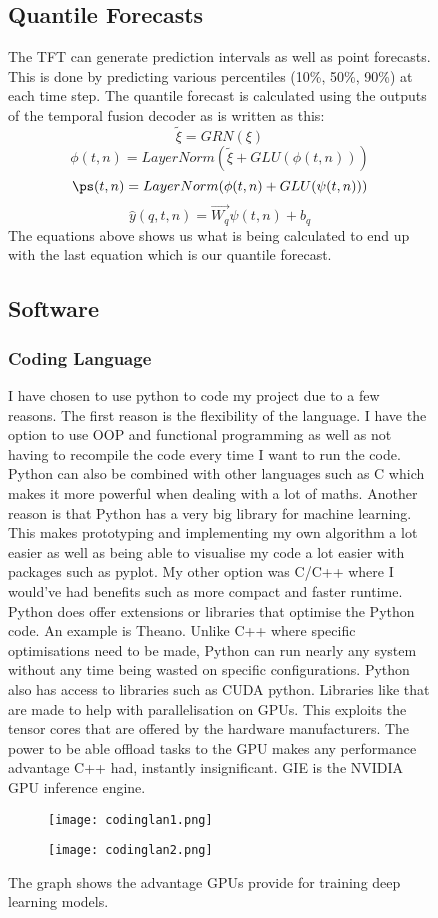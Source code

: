 \documentclass{article}
\begin{document}
\begin{figure}[h!]
\subsection{Quantile Forecasts}
The TFT can generate prediction intervals as well as point forecasts. This is done by predicting various percentiles (10\%, 50\%, 90\%) at each time step. The quantile forecast is calculated using the outputs of the temporal fusion decoder as is written as this:
$$\tilde{\xi} = GRN(\xi)$$
$$\phi(t,n)=LayerNorm(\tilde{\xi}+ GLU(\phi(t,n)))$$
$$\ps(t,n)= LayerNorm(\phi(t,n)+GLU(\psi(t,n)))$$
$$\hat{y}(q,t,n)=\vec{W_q}\psi(t,n)+b_q$$
The equations above shows us what is being calculated to end up with the last equation which is our quantile forecast.


\subsection{Software}

\subsubsection{Coding Language}
I have chosen to use python to code my project due to a few reasons. The first reason is the flexibility of the language. I have the option to use OOP and functional programming as well as not having to recompile the code every time I want to run the code. Python can also be combined with other languages such as C which makes it more powerful when dealing with a lot of maths.
Another reason is that Python has a very big library for machine learning. This makes prototyping and implementing my own algorithm a lot easier as well as being able to visualise my code a lot easier with packages such as pyplot.
My other option was C/C++ where I would’ve had benefits such as more compact and faster runtime. Python does offer extensions or libraries that optimise the Python code. An example is Theano. Unlike C++ where specific optimisations need to be made, Python can run nearly any system without any time being wasted on specific configurations. Python also has access to libraries such as CUDA python. Libraries like that are made to help with parallelisation on GPUs. This exploits the tensor cores that are offered by the hardware manufacturers. The power to be able offload tasks to the GPU makes any performance advantage C++ had, instantly insignificant.
GIE is the NVIDIA GPU inference engine.
\begin{wrapfigure}{l}{0.25\textwidth}
    \centering
    \texttt{[image: codinglan1.png]}
\end{wrapfigure}
\begin{wrapfigure}{l}{0.25\textwidth}
    \centering
    \texttt{[image: codinglan2.png]}
\end{wrapfigure}
The graph shows the advantage GPUs provide for training deep learning models.


\end{figure}
\end{document}
